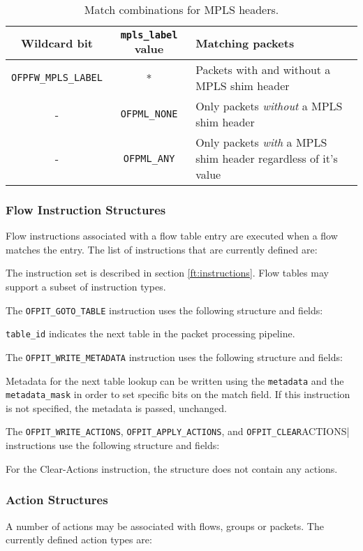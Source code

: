 \begin{table}[hbp]
\centering
\begin{tabularx}{\textwidth}{|c|c|X|}
\hline
Wildcard bit & \verb|mpls_label| value & Matching packets \\
\hline
\verb|OFPFW_MPLS_LABEL| & * & Packets with and without a MPLS shim header \\
\hline
- & \verb|OFPML_NONE| & Only packets \emph{without} a MPLS shim header \\
\hline
- & \verb|OFPML_ANY| & Only packets \emph{with} a MPLS shim header regardless of it's value \\
\hline
\end{tabularx}
\caption{Match combinations for MPLS headers.}
\label{table:mpls wildcards}
\end{table}

\subsubsection{Flow Instruction Structures}
Flow instructions associated with a flow table entry are executed when a flow matches the entry. The list of instructions that are currently defined are:


The instruction set is described in section \ref{ft:instructions}.  Flow tables may support a subset of instruction types.

The \verb|OFPIT_GOTO_TABLE| instruction uses the following structure and fields:

\verb|table_id| indicates the next table in the packet processing pipeline.

The \verb|OFPIT_WRITE_METADATA| instruction uses the following structure and fields:

Metadata for the next table lookup can be written using the \verb|metadata| and the \verb|metadata_mask| in order to set specific bits on the match field.   If this instruction is not specified, the metadata is passed, unchanged.

The \verb|OFPIT_WRITE_ACTIONS|, \verb|OFPIT_APPLY_ACTIONS|, and \verb|OFPIT_CLEAR|ACTIONS| instructions use the following structure and fields:

For the Clear-Actions instruction, the structure does not contain any actions.

\subsubsection{Action Structures}
A number of actions may be associated with flows, groups or packets.  The currently defined action types are:

